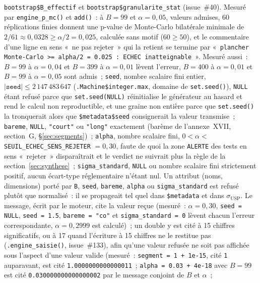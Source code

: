 \documentclass[a4paper,11pt]{article}
\newcommand{\code}[1]{\texttt{\small #1}}
\begin{document}
\begin{itemize}[itemsep=2pt]
  \code{bootstrap\$B\_effectif} et \code{bootstrap\$granularite\_stat} (issue~\#40). Mesuré par
  \code{engine\_p\_mc()} et \code{add()}~: à $B = 99$ et $\alpha = 0{,}05$, valeurs admises, $60$
  réplications finies donnent une p-value de Monte-Carlo bilatérale minimale de
  $2/61 \approx 0{,}0328 \ge \alpha/2 = 0{,}025$, calculée sans motif ($60 \ge 50$), et le
  commentaire d'une ligne en sens «~ne pas rejeter~» qui la retient se termine par
  «~\code{plancher Monte-Carlo >= alpha/2 = 0.025~: ECHEC inatteignable}~».
  Mesuré aussi~:
  $B = 99$ à $\alpha = 0{,}04$ et $B = 399$ à $\alpha = 0{,}01$ lèvent l'erreur, $B = 400$ à
  $\alpha = 0{,}01$ et $B = 99$ à $\alpha = 0{,}05$ sont admis~; \code{seed}, nombre
  scalaire fini entier,
  $|\mathtt{seed}| \le 2\,147\,483\,647$ (\code{.Machine\$integer.max}, domaine de
  \code{set.seed()}), \code{NULL} étant refusé parce que \code{set.seed(NULL)} réinitialise le
  générateur au hasard et rend le calcul non reproductible, et une graine non entière parce que
  \code{set.seed()} la tronquerait alors que \code{\$metadata\$seed} consignerait la valeur
  transmise~; \code{bareme}, \code{NULL}, \code{"court"} ou \code{"long"} exactement (barème de
  l'annexe~XVII, section~G, §\ref{sec:segments})~; \code{alpha}, nombre scalaire fini,
  $0 < \alpha <$ \code{SEUIL\_ECHEC\_SENS\_REJETER} $= 0{,}30$, faute de quoi la zone
  \code{ALERTE} des tests en sens «~rejeter~» disparaîtrait et le verdict ne suivrait plus la
  règle de la section~\ref{sec:synthese}~; \code{sigma\_standard}, \code{NULL} ou nombre
  scalaire fini strictement positif, aucun écart-type réglementaire n'étant nul. Un attribut
  (noms, dimensions) porté par \code{B}, \code{seed}, \code{bareme}, \code{alpha} ou
  \code{sigma\_standard} est refusé plutôt que normalisé~: il
  se propageait tel quel dans \code{\$metadata} et dans $\sigma_{\mathrm{USP}}$. Le message, écrit
  par le moteur, cite la valeur reçue (mesuré~: $\alpha = 0{,}30$, \code{seed = NULL},
  \code{seed = 1.5}, \code{bareme = "co"} et \code{sigma\_standard = 0} lèvent chacun
  l'erreur correspondante, $\alpha = 0{,}2999$ est calculé)~; un double y est cité à
  15 chiffres significatifs, ou à 17 quand l'écriture à 15 chiffres ne le restitue pas
  (\code{.engine\_saisie()}, issue~\#133), afin qu'une valeur refusée ne soit pas affichée
  sous l'aspect d'une valeur valide (mesuré~: \code{segment = 1 + 1e-15}, cité \code{1}
  auparavant, est cité \code{1.0000000000000011}~; \code{alpha = 0.03 + 4e-18} avec $B = 99$
  est cité \code{0.030000000000000002} par le message conjoint de $B$ et $\alpha$~;

\end{itemize}
\end{document}
